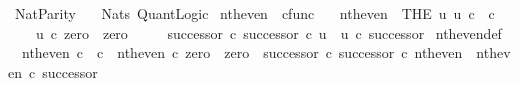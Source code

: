 %
\begin{isabellebody}%
%
%
\isadelimdocument
%
\endisadelimdocument
%
\isatagdocument
%
\isamarkuptrue%
%
\endisatagdocument
{\isafolddocument}%
%
\isadelimdocument
%
\endisadelimdocument
%
\isadelimtheory
%
\endisadelimtheory
%
\isatagtheory
{}\isamarkupfalse%
\ Nat{\isacharunderscore}{\kern0pt}Parity\isanewline
\ \ \ Nats\ Quant{\isacharunderscore}{\kern0pt}Logic\isanewline
{}%
\endisatagtheory
{\isafoldtheory}%
%
\isadelimtheory
%
\endisadelimtheory
%
\isadelimdocument
%
\endisadelimdocument
%
\isatagdocument
%
\isamarkuptrue%
%
\endisatagdocument
{\isafolddocument}%
%
\isadelimdocument
%
\endisadelimdocument
{}\isamarkupfalse%
\ nth{\isacharunderscore}{\kern0pt}even\ {\isacharcolon}{\kern0pt}{\isacharcolon}{\kern0pt}\ {\isachardoublequoteopen}cfunc{\isachardoublequoteclose}\ \isanewline
\ \ {\isachardoublequoteopen}nth{\isacharunderscore}{\kern0pt}even\ {\isacharequal}{\kern0pt}\ {\isacharparenleft}{\kern0pt}THE\ u{\isachardot}{\kern0pt}\ u{\isacharcolon}{\kern0pt}\ {\isasymnat}\isactrlsub c\ {\isasymrightarrow}\ {\isasymnat}\isactrlsub c\ {\isasymand}\ \isanewline
\ \ \ \ u\ {\isasymcirc}\isactrlsub c\ zero\ {\isacharequal}{\kern0pt}\ zero\ {\isasymand}\isanewline
\ \ \ \ {\isacharparenleft}{\kern0pt}successor\ {\isasymcirc}\isactrlsub c\ successor{\isacharparenright}{\kern0pt}\ {\isasymcirc}\isactrlsub c\ u\ {\isacharequal}{\kern0pt}\ u\ {\isasymcirc}\isactrlsub c\ successor{\isacharparenright}{\kern0pt}{\isachardoublequoteclose}\isanewline
\isanewline
{}\isamarkupfalse%
\ nth{\isacharunderscore}{\kern0pt}even{\isacharunderscore}{\kern0pt}def{}{\isacharcolon}{\kern0pt}\isanewline
\ \ {\isachardoublequoteopen}nth{\isacharunderscore}{\kern0pt}even{\isacharcolon}{\kern0pt}\ {\isasymnat}\isactrlsub c\ {\isasymrightarrow}\ {\isasymnat}\isactrlsub c\ {\isasymand}\ nth{\isacharunderscore}{\kern0pt}even\ {\isasymcirc}\isactrlsub c\ zero\ {\isacharequal}{\kern0pt}\ zero\ {\isasymand}\ {\isacharparenleft}{\kern0pt}successor\ {\isasymcirc}\isactrlsub c\ successor{\isacharparenright}{\kern0pt}\ {\isasymcirc}\isactrlsub c\ nth{\isacharunderscore}{\kern0pt}even\ {\isacharequal}{\kern0pt}\ nth{\isacharunderscore}{\kern0pt}even\ {\isasymcirc}\isactrlsub c\ successor{\isachardoublequoteclose}\isanewline
%
\isadelimproof
\ \ %
\endisadelimproof
%
\isatagproof

\end{isabellebody}

